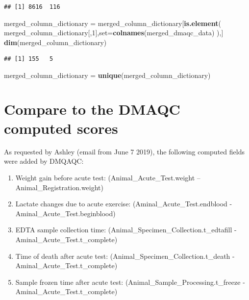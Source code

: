 \documentclass[]{article}
\newenvironment{Shaded}{\begin{snugshade}}{\end{snugshade}}
\newcommand{\KeywordTok}[1]{\textcolor[rgb]{0.13,0.29,0.53}{\textbf{#1}}}
\newcommand{\DataTypeTok}[1]{\textcolor[rgb]{0.13,0.29,0.53}{#1}}
\newcommand{\DecValTok}[1]{\textcolor[rgb]{0.00,0.00,0.81}{#1}}
\newcommand{\StringTok}[1]{\textcolor[rgb]{0.31,0.60,0.02}{#1}}
\newcommand{\NormalTok}[1]{#1}
\providecommand{\tightlist}{%
  \setlength{\itemsep}{0pt}\setlength{\parskip}{0pt}}
\begin{document}
\begin{verbatim}
## [1] 8616  116
\end{verbatim}

\begin{Shaded}
\begin{Highlighting}[]
\NormalTok{merged_column_dictionary =}\StringTok{ }\NormalTok{merged_column_dictionary[}\KeywordTok{is.element}\NormalTok{(}
\NormalTok{  merged_column_dictionary[,}\DecValTok{1}\NormalTok{],}\DataTypeTok{set=}\KeywordTok{colnames}\NormalTok{(merged_dmaqc_data)}
\NormalTok{  ),]}
\KeywordTok{dim}\NormalTok{(merged_column_dictionary)}
\end{Highlighting}
\end{Shaded}

\begin{verbatim}
## [1] 155   5
\end{verbatim}

\begin{Shaded}
\begin{Highlighting}[]
\NormalTok{merged_column_dictionary =}\StringTok{ }\KeywordTok{unique}\NormalTok{(merged_column_dictionary)}
\end{Highlighting}
\end{Shaded}

\section{Compare to the DMAQC computed
scores}\label{compare-to-the-dmaqc-computed-scores}

As requested by Ashley (email from June 7 2019), the following computed
fields were added by DMQAQC:

\begin{enumerate}
\def\labelenumi{\arabic{enumi}.}
\tightlist
\item
  Weight gain before acute test: (Animal\_Acute\_Test.weight --
  Animal\_Registration.weight)
\item
  Lactate changes due to acute exercise: (Aminal\_Acute\_Test.endblood -
  Aminal\_Acute\_Test.beginblood)
\item
  EDTA sample collection time: (Animal\_Specimen\_Collection.t\_edtafill
  - Aminal\_Acute\_Test.t\_complete)
\item
  Time of death after acute test: (Animal\_Specimen\_Collection.t\_death
  - Aminal\_Acute\_Test.t\_complete)
\item
  Sample frozen time after acute test:
  (Animal\_Sample\_Processing.t\_freeze -
  Aminal\_Acute\_Test.t\_complete)
\end{enumerate}
\end{document}
